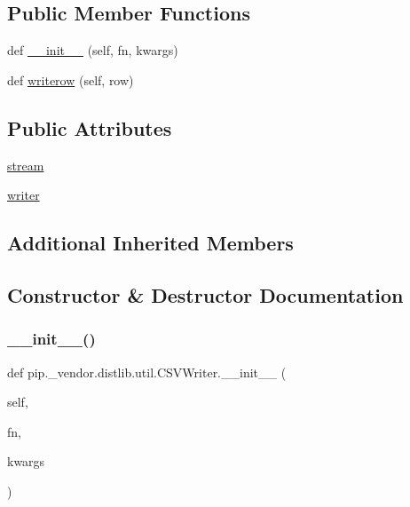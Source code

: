 \subsection*{Public Member Functions}
\begin{DoxyCompactItemize}
\item 
def \hyperlink{classpip_1_1__vendor_1_1distlib_1_1util_1_1CSVWriter_a769b38d30e0f3a0f0b37543b97e89c67}{\+\_\+\+\_\+init\+\_\+\+\_\+} (self, fn, kwargs)
\item 
def \hyperlink{classpip_1_1__vendor_1_1distlib_1_1util_1_1CSVWriter_a035a0eaf0732ff8c730bd87de50b4f34}{writerow} (self, row)
\end{DoxyCompactItemize}
\subsection*{Public Attributes}
\begin{DoxyCompactItemize}
\item 
\hyperlink{classpip_1_1__vendor_1_1distlib_1_1util_1_1CSVWriter_a0d4cf524d11ce2bda142d25e5d5de2ec}{stream}
\item 
\hyperlink{classpip_1_1__vendor_1_1distlib_1_1util_1_1CSVWriter_a711f027fc4bcec880858d48c0f3a7ac4}{writer}
\end{DoxyCompactItemize}
\subsection*{Additional Inherited Members}


\subsection{Constructor \& Destructor Documentation}
\mbox{\label{classpip_1_1__vendor_1_1distlib_1_1util_1_1CSVWriter_a769b38d30e0f3a0f0b37543b97e89c67}} 
\subsubsection{\texorpdfstring{\+\_\+\+\_\+init\+\_\+\+\_\+()}{\_\_init\_\_()}}
{\footnotesize\ttfamily def pip.\+\_\+vendor.\+distlib.\+util.\+C\+S\+V\+Writer.\+\_\+\+\_\+init\+\_\+\+\_\+ (\begin{DoxyParamCaption}\item[{}]{self,  }\item[{}]{fn,  }\item[{}]{kwargs }\end{DoxyParamCaption})}



